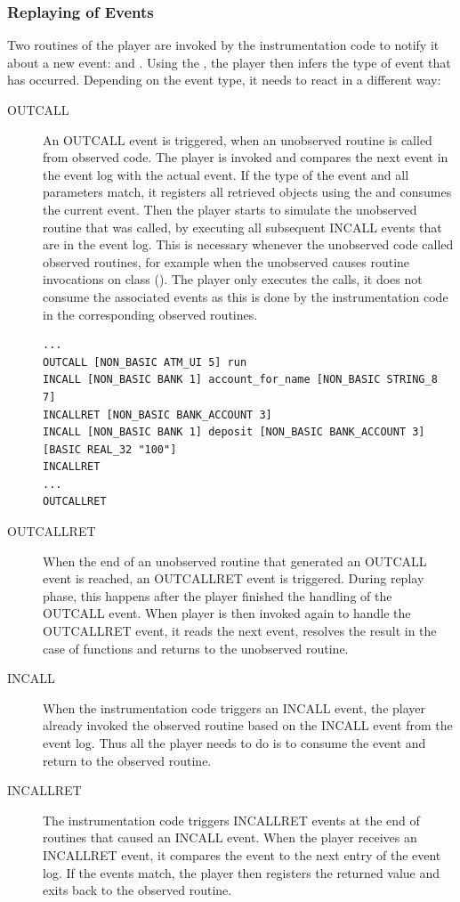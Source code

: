 \subsubsection{Replaying of Events}
Two routines of the player are invoked by the instrumentation code to notify it about a new event:  and . Using the , the player then infers the type of event that has occurred. Depending on the event type, it needs to react in a different way:

\begin{description}
\item[OUTCALL] An OUTCALL event is triggered, when an unobserved routine is called from observed code. The player is invoked and compares the next event in the event log with the actual event. If the type of the event and all parameters match, it registers all retrieved objects using the  and consumes the current event. Then the player starts to simulate the unobserved routine that was called, by executing all subsequent INCALL events that are in the event log. This is necessary whenever the unobserved code called observed routines, for example when the unobserved  causes routine invocations on class  ().  The player only executes the calls, it does not consume the associated events as this is done by the instrumentation code in the corresponding observed routines.
\begin{lstlisting}[caption=Example Event Log that Requires Simulation of the Unobserved Routine,label=lst:eventlog_unobserved_simulation]
...
OUTCALL [NON_BASIC ATM_UI 5] run
INCALL [NON_BASIC BANK 1] account_for_name [NON_BASIC STRING_8 7]
INCALLRET [NON_BASIC BANK_ACCOUNT 3]
INCALL [NON_BASIC BANK 1] deposit [NON_BASIC BANK_ACCOUNT 3] [BASIC REAL_32 "100"]
INCALLRET
...
OUTCALLRET
\end{lstlisting}
\item[OUTCALLRET] When the end of an unobserved routine that generated an OUTCALL event is reached, an OUTCALLRET event is triggered. During replay phase, this happens after the player finished the handling of the OUTCALL event. When player is then invoked again to handle the OUTCALLRET event, it reads the next event, resolves the result in the case of functions and returns to the unobserved routine.
\item[INCALL] When the instrumentation code triggers an INCALL event, the player already invoked the observed routine based on the INCALL event from the event log. Thus all the player needs to do is to consume the event and return to the observed routine.
\item[INCALLRET] The instrumentation code triggers INCALLRET events at the end of routines that caused an INCALL event. When the player receives an INCALLRET event, it compares the event to the next entry of the event log. If the events match, the player then registers the returned value and exits back to the observed routine.
\end{description}


